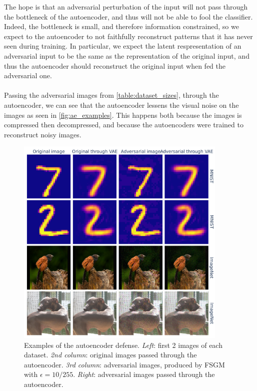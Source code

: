 \documentclass[]{scrarticle}
\begin{document}
The hope is that an adversarial perturbation of the input
will not pass through the bottleneck of the autoencoder,
and thus will not be able to fool the classifier.
Indeed, the bottleneck is small, and therefore information
constrained, so we expect to the autoencoder to
not faithfully reconstruct patterns that it has never seen
during training. In particular, we expect the latent respresentation
of an adversarial input to be the same as the representation of
the original input, and thus the autoencoder should reconstruct the
original input when fed the adversarial one.




\paragraph{}
Passing the adversarial images from \autoref{table:dataset_sizes},
through the autoencoder, we can see that the autoencoder
lessens the visual noise on the images as seen in \autoref{fig:ae_examples}.
This happens both because the images is compressed then decompressed,
and because the autoencoders were trained to reconstruct noisy images.

\begin{figure}[h]
  \centering
  \includegraphics[width=0.9\textwidth]{images/ae_examples.png}
  \caption{
    Examples of the autoencoder defense.
    \emph{Left}: first 2 images of each dataset.
    \emph{2nd column}: original images passed through the autoencoder.
    \emph{3rd column}: adversarial images, produced by FSGM with $\epsilon = 10/ 255$.
    \emph{Right}: adversarial images passed through the autoencoder.
  }
  \label{fig:ae_examples}
\end{figure}
\end{document}
